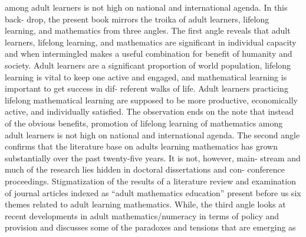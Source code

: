 \documentclass{article}
\begin{document}
among adult learners is not high on national and international agenda. In this back-
drop, the present book mirrors the troika of adult learners, lifelong learning, and
mathematics from three angles. The first angle reveals that adult learners, lifelong
learning, and mathematics are significant in individual capacity and when intermingled
makes a useful combination for benefit of humanity and society. Adult learners are
a significant proportion of world population, lifelong learning is vital to keep one
active and engaged, and mathematical learning is important to get success in dif-
referent walks of life. Adult learners practicing lifelong mathematical learning are
supposed to be more productive, economically active, and individually satisfied.
The observation ends on the note that instead of the obvious benefits, promotion of
lifelong learning of mathematics among adult learners is not high on national and
international agenda.
The second angle confirms that the literature base on adults learning mathematics
has grown substantially over the past twenty-five years. It is not, however, main-
stream and much of the research lies hidden in doctoral dissertations and con-
   conference proceedings. Stigmatization of the results of a literature review and
examination of journal articles indexed as “adult mathematics education” present
before us six themes related to adult learning mathematics. While, the third angle
looks at recent developments in adult mathematics/numeracy in terms of policy and
provision and discusses some of the paradoxes and tensions that are emerging as
\textit{\\\\}
\end{document}
